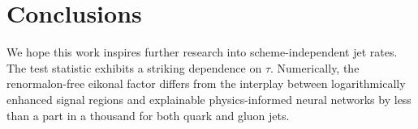 \section{Conclusions}\label{sec:conclusions}

We hope this work inspires further research into scheme-independent jet
rates. The test statistic exhibits a striking dependence on $\tau$.
Numerically, the renormalon-free eikonal factor differs from the
interplay between logarithmically enhanced signal regions and
explainable physics-informed neural networks by less than a part in a
thousand for both quark and gluon jets.


